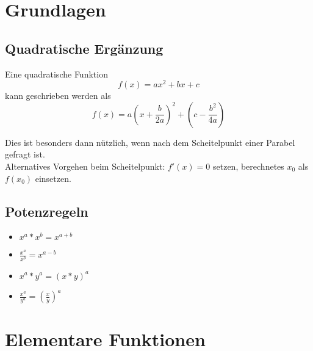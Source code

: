 \documentclass[12pt, a4paper]{scrreprt}
\begin{document}


\tableofcontents
\pagebreak

\chapter{Grundlagen}
\section{Quadratische Ergänzung}

Eine quadratische Funktion
\[f(x)=ax^2+bx+c\]
kann geschrieben werden als
\[
  f(x)=a {\left (x+\frac{b}{2a} \right)}^2+ \left (c-\frac{b^2}{4a} \right)
\]

Dies ist besonders dann nützlich, wenn nach dem Scheitelpunkt einer Parabel gefragt ist.\\
Alternatives Vorgehen beim Scheitelpunkt: \(f'(x) = 0\) setzen, berechnetes \(x_0\) als \(f(x_0)\) einsetzen.

\section{Potenzregeln}

\begin{itemize}
\item \(x^a * x^b = x^{a+b}\)
\item \(\frac{x^a}{x^b} = x^{a-b}\)
\item \(x^a * y^a = {(x * y)}^a\)
\item \(\frac{x^a}{y^a} = {\left(\frac{x}{y}\right)}^a\)
\end{itemize}

\setcounter{chapter}{4}

\chapter{Elementare Funktionen}

\begin{figure}[H]
  \centering
  \hfill%
  \subfloat[Tangens]{}
\end{figure}

%   
\end{document}
